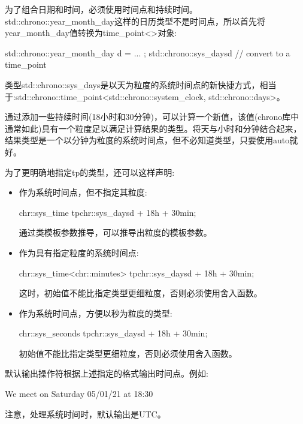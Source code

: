 为了组合日期和时间，必须使用时间点和持续时间。std::chrono::year\_month\_day这样的日历类型不是时间点，所以首先将year\_month\_day值转换为time\_point<>对象:

\begin{cpp}
std::chrono::year_month_day d = ... ;
std::chrono::sys_days{d} // convert to a time_point
\end{cpp}

类型std::chrono::sys\_days是以天为粒度的系统时间点的新快捷方式，相当于:std::chrono::time\_point<std::chrono::system\_clock, std::chrono::days>。

通过添加一些持续时间(18小时和30分钟)，可以计算一个新值，该值(chrono库中通常如此)具有一个粒度足以满足计算结果的类型。将天与小时和分钟结合起来，结果类型是一个以分钟为粒度的系统时间点，但不必知道类型，只要使用auto就好。

为了更明确地指定tp的类型，还可以这样声明:

\begin{itemize}
\item
作为系统时间点，但不指定其粒度:

\begin{cpp}
chr::sys_time tp{chr::sys_days{d} + 18h + 30min};
\end{cpp}

通过类模板参数推导，可以推导出粒度的模板参数。

\item
作为具有指定粒度的系统时间点:

\begin{cpp}
chr::sys_time<chr::minutes> tp{chr::sys_days{d} + 18h + 30min};
\end{cpp}

这时，初始值不能比指定类型更细粒度，否则必须使用舍入函数。

\item
作为系统时间点，方便以秒为粒度的类型:

\begin{cpp}
chr::sys_seconds tp{chr::sys_days{d} + 18h + 30min};
\end{cpp}

初始值不能比指定类型更细粒度，否则必须使用舍入函数。
\end{itemize}

默认输出操作符根据上述指定的格式输出时间点。例如:

\begin{shell}
We meet on Saturday 05/01/21 at 18:30
\end{shell}

注意，处理系统时间时，默认输出是UTC。


